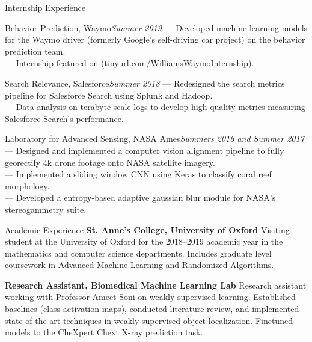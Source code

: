 \documentclass{resume} %
\begin{document}
\begin{rSection}{Internship Experience}
	{
		\begin{rSubsection}{Behavior Prediction,  Waymo}{\em Summer 2019}{}{}
			--- Developed machine learning models for the Waymo driver (formerly Google's self-driving car project) on the behavior prediction team. \\
			--- Internship featured on \href{https://blog.waymo.com/2019/12/from-hosted-to-host-internship.html}{} (tinyurl.com/WilliamsWaymoInternship).
		\end{rSubsection}
	}
	{
		\begin{rSubsection}{Search Relevance, Salesforce}{\em Summer 2018}{}{}
			--- Redesigned the search metrics pipeline for Salesforce Search using Splunk and Hadoop. \\
			--- Data analysis on terabyte-scale logs to develop high quality metrics measuring Salesforce Search's performance.
		\end{rSubsection}
	}
	{
		\begin{rSubsection}{Laboratory for Advanced Sensing, NASA Ames}{\em Summers 2016 and Summer 2017}{}{}
			--- Designed and implemented a computer vision alignment pipeline to fully georectify 4k drone footage onto NASA satellite imagery. \\
			--- Implemented a sliding window CNN using Keras to classify coral reef morphology. \\
			--- Developed a entropy-based adaptive gaussian blur module for NASA's stereogammetry suite.
		\end{rSubsection}
	}

\end{rSection}  %

\begin{rSection}{Academic Experience}
	{\textbf{St. Anne's College, University of Oxford} Visiting student at the University of Oxford for the 2018--2019 academic year in the mathematics and computer science departments. Includes graduate level coursework in Advanced Machine Learning and Randomized Algorithms.}

	{\textbf{Research Assistant, Biomedical Machine Learning Lab} Research assistant working with Professor Ameet Soni on weakly supervised learning. Established baselines (class activation maps), conducted literature review, and implemented state-of-the-art techniques in weakly supervised object localization. Finetuned models to the CheXpert Chext X-ray prediction task.}
\end{rSection}  %
\end{document}
